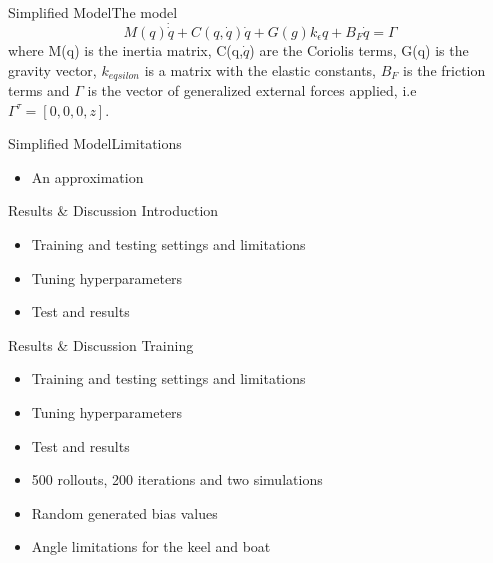 \documentclass{beamer}
\begin{document}
\begin{frame}{Simplified Model}{The model \vphantom{(y}}
\vspace{-0.7em}
$$
  M(q)\dot{\dot{q}} + C(q,\dot{q})\dot{q} + G(g) k_{\epsilon}q + B_F \dot{q}  = \Gamma
$$
\footnotesize{
where M(q) is the inertia matrix, C(q,$\dot{q}$) are the Coriolis terms, G(q) is the gravity vector, $k_{eqsilon}$ is a matrix with the elastic constants, $B_F$ is the friction terms and $\Gamma$ is the vector of generalized external forces applied, i.e $\Gamma ^\tau = [0,0,0,z]$.}
\end{frame}

\begin{frame}{Simplified Model}{Limitations \vphantom{(y}}
\vspace{-0.7em}

\footnotesize{\begin{itemize}
  \item An approximation
\end{itemize}}
\end{frame}

\begin{frame}{Results \& Discussion }{Introduction\vphantom{(y}}
\vspace{-0.7em}
\begin{itemize}
  \item Training and testing settings and limitations
  \item Tuning hyperparameters
  \item Test and results
\end{itemize}
\end{frame}

\begin{frame}{Results \& Discussion }{Training \vphantom{(y}}
\vspace{-0.7em}
\begin{itemize}
  \item {\color{blue}Training and testing settings and limitations}
  \item Tuning hyperparameters
  \item Test and results
\end{itemize}
\footnotesize{\begin{itemize}
  \item 500 rollouts, 200 iterations and two simulations
  \item Random generated bias values
  \item Angle limitations for the keel and boat
\end{itemize}}
\end{frame}
\end{document}
